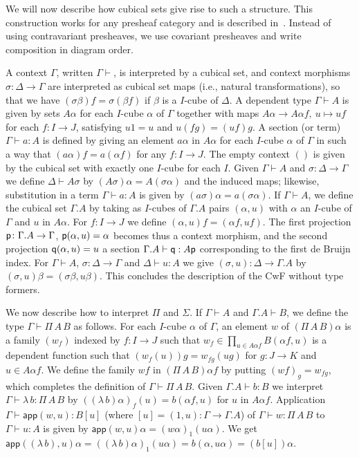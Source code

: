 \documentclass[10pt,a4paper]{article}
\newcommand{\app}{\mathsf{app}}
\newcommand{\pp}{{\sf p}}
\newcommand{\qq}{{\sf q}}
\begin{document}
We will now describe how cubical sets give rise to such a structure.
This construction works for any presheaf category and is described
in~\cite[Sec.~4]{Hofmann}.  Instead of using contravariant presheaves,
we use covariant presheaves and write composition in diagram order.

A context $\Gamma$, written $\Gamma \vdash$, is interpreted by a
cubical set, and context morphisms $\sigma:\Delta\to\Gamma$ are
interpreted as cubical set maps (i.e., natural transformations), so
that we have $(\sigma\beta)f = \sigma(\beta f)$ if $\beta$ is a
$I$-cube of $\Delta$.  A dependent type $\Gamma\vdash A$ is given by
sets $A\alpha$ for each $I$-cube $\alpha$ of $\Gamma$ together with
maps $A\alpha\to A\alpha f,~u\longmapsto uf$ for each $f \colon I \to
J$, satisfying $u1 = u$ and $u(fg) = (uf)g$.  A section (or term)
$\Gamma\vdash a:A$ is defined by giving an element $a\alpha$ in
$A\alpha$ for each $I$-cube $\alpha$ of $\Gamma$ in such a way that
$(a\alpha) f = a (\alpha f)$ for any $f \colon I \to J$.  The empty
context $()$ is given by the cubical set with exactly one $I$-cube for
each $I$.  Given $\Gamma \vdash A$ and $\sigma \colon \Delta \to
\Gamma$ we define $\Delta \vdash A \sigma$ by $(A \sigma) \alpha = A
(\sigma \alpha)$ and the induced maps; likewise, substitution in a
term $\Gamma \vdash a : A$ is given by $(a \sigma) \alpha = a (\sigma
\alpha)$.  If $\Gamma\vdash A$, we define the cubical set $\Gamma.A$
by taking as $I$-cubes of $\Gamma.A$ pairs $(\alpha,u)$ with $\alpha$
an $I$-cube of $\Gamma$ and $u$ in $A\alpha$. For $f:I\to J$ we define
$(\alpha,u)f = (\alpha f,u f)$.  The first projection $\pp \colon
\Gamma.A \to \Gamma$, $\pp (\alpha, u) = \alpha$ becomes thus a
context morphism, and the second projection $\qq (\alpha, u) = u$ a
section $\Gamma.A \vdash \qq : A \pp$ corresponding to the first de
Bruijn index.  For $\Gamma \vdash A$, $\sigma \colon \Delta \to
\Gamma$ and $\Delta \vdash u : A$ we give $(\sigma, u) \colon \Delta
\to \Gamma.A$ by $(\sigma, u) \beta = (\sigma \beta, u \beta)$.  This
concludes the description of the CwF without type formers.

We now describe how to interpret $\Pi$ and $\Sigma$. If $\Gamma\vdash
A$ and $\Gamma.A\vdash B$, we define the type $\Gamma\vdash \Pi\,A\,B$
as follows.  For each $I$-cube $\alpha$ of $\Gamma$, an element $w$ of
$(\Pi\,A\,B)\alpha$ is a family $(w_f)$ indexed by $f:I\to J$ such
that $w_f \in \prod_{u \in A \alpha f} B (\alpha f, u)$ is a dependent
function such that $(w_f (u)) g = w_{fg} (u g)$ for $g \colon J \to K$
and $u \in A \alpha f$.  We define the family $wf$ in $(\Pi\,A\,B)
\alpha f$ by putting $(wf)_g = w_{fg}$, which completes the definition
of $\Gamma\vdash \Pi\,A\,B$.  Given $\Gamma.A \vdash b : B$ we
interpret $\Gamma \vdash \lambda\,b : \Pi\,A\,B$ by $ ((\lambda\, b)
\alpha)_f (u) = b (\alpha f, u)$ for $u$ in $A \alpha f$.  Application
$\Gamma \vdash \app (w,u) : B [u]$ (where $[u] = (1, u) \colon \Gamma
\to \Gamma.A$) of $\Gamma \vdash w : \Pi\,A\,B$ to $\Gamma \vdash u :
A$ is given by $\app (w, u) \alpha = (w\alpha)_1 (u\alpha)$.  We get
$\app ((\lambda\,b), u) \alpha = ((\lambda\,b) \alpha)_1 (u \alpha) =
b (\alpha, u\alpha) = (b [u]) \alpha$.
\end{document}
